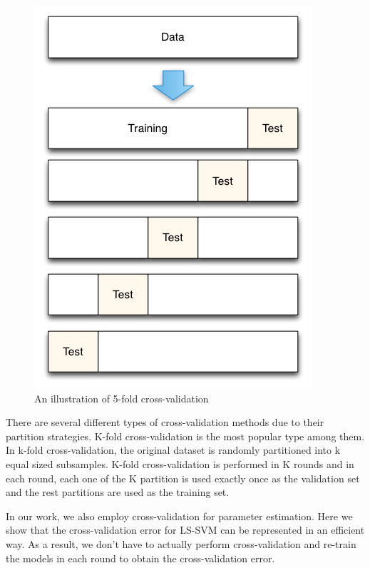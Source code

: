 \begin{figure}
	\centering
	\includegraphics[scale=.5]{transfer/fig/cv.png}
	\caption{An illustration of 5-fold cross-validation}
\end{figure}
There are several different types of cross-validation methods due to their partition strategies. K-fold cross-validation is the most popular type among them. In k-fold cross-validation, the original dataset is randomly partitioned into k equal sized subsamples. K-fold cross-validation is performed in K rounds and in each round, each one of the K partition is used exactly once as the validation set and the rest partitions are used as the training set. 

In our work, we also employ cross-validation for parameter estimation. Here we show that the cross-validation error for LS-SVM can be represented in an efficient way. As a result, we don't have to actually perform cross-validation and re-train the models in each round to obtain the cross-validation error.

